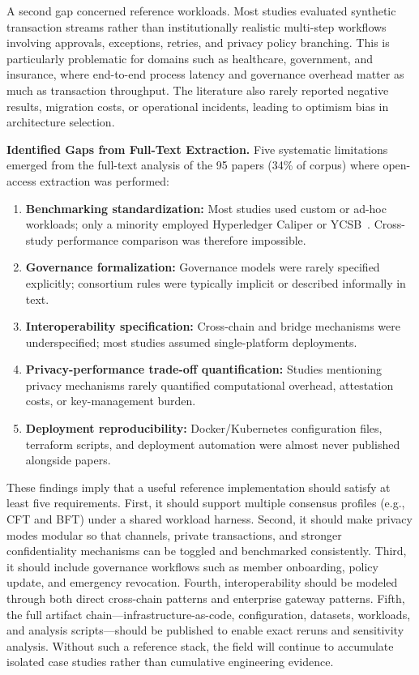 \documentclass[journal]{IEEEtran}
\begin{document}
A second gap concerned reference workloads. Most studies evaluated synthetic transaction streams rather than institutionally realistic multi-step workflows involving approvals, exceptions, retries, and privacy policy branching. This is particularly problematic for domains such as healthcare, government, and insurance, where end-to-end process latency and governance overhead matter as much as transaction throughput. The literature also rarely reported negative results, migration costs, or operational incidents, leading to optimism bias in architecture selection.

\textbf{Identified Gaps from Full-Text Extraction.}
Five systematic limitations emerged from the full-text analysis of the 95 papers (34\% of corpus) where open-access extraction was performed:

\begin{enumerate}
  \item \textbf{Benchmarking standardization:} Most studies used custom or ad-hoc workloads; only a minority employed Hyperledger Caliper or YCSB~\cite{hyperledger2024caliper}. Cross-study performance comparison was therefore impossible.
  \item \textbf{Governance formalization:} Governance models were rarely specified explicitly; consortium rules were typically implicit or described informally in text.
  \item \textbf{Interoperability specification:} Cross-chain and bridge mechanisms were underspecified; most studies assumed single-platform deployments.
  \item \textbf{Privacy-performance trade-off quantification:} Studies mentioning privacy mechanisms rarely quantified computational overhead, attestation costs, or key-management burden.
  \item \textbf{Deployment reproducibility:} Docker/Kubernetes configuration files, terraform scripts, and deployment automation were almost never published alongside papers.
\end{enumerate}

These findings imply that a useful reference implementation should satisfy at least five requirements. First, it should support multiple consensus profiles (e.g., CFT and BFT) under a shared workload harness. Second, it should make privacy modes modular so that channels, private transactions, and stronger confidentiality mechanisms can be toggled and benchmarked consistently. Third, it should include governance workflows such as member onboarding, policy update, and emergency revocation. Fourth, interoperability should be modeled through both direct cross-chain patterns and enterprise gateway patterns. Fifth, the full artifact chain---infrastructure-as-code, configuration, datasets, workloads, and analysis scripts---should be published to enable exact reruns and sensitivity analysis. Without such a reference stack, the field will continue to accumulate isolated case studies rather than cumulative engineering evidence.
\end{document}

